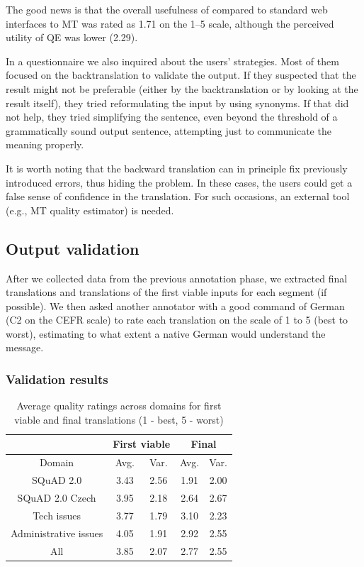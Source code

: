 The good news is that the overall usefulness of \ptakopet{} compared to standard web interfaces to MT was rated as 1.71 on the 1--5 scale, although the perceived utility of QE was lower (2.29).

In a questionnaire we also inquired about the users' strategies. Most of them focused on the backtranslation to validate the output. If they suspected that the result might not be preferable (either by the backtranslation or by looking at the result itself), they tried reformulating the input by using synonyms. If that did not help, they tried simplifying the sentence, even beyond the threshold of a grammatically sound output sentence, attempting just to communicate the meaning properly.

It is worth noting that the backward translation can in principle fix previously introduced errors, thus hiding the problem. In these cases, the users could get a false sense of confidence in the translation. For such occasions, an external tool (e.g., MT quality estimator) is needed.

\subsection{Output validation}
\label{validation}

After we collected data from the previous annotation phase, we extracted final translations and translations of the first viable inputs for each segment (if possible). We then asked another annotator with a good command of German (C2 on the CEFR scale) to rate each translation on the scale of 1 to 5 (best to worst), estimating to what extent a native German would understand the message. 

\subsubsection{Validation results}


\begin{table}[ht]
    \centering
    \begin{tabular}{| c | c c | c c |}
    \hline
         & \multicolumn{2}{c|}{First viable} & \multicolumn{2}{c|}{Final} \\
    \hline
    Domain & Avg. & Var. & Avg. & Var. \\
    \hline
        SQuAD 2.0 & 3.43 & 2.56 & 1.91 & 2.00 \\
        SQuAD 2.0 Czech & 3.95 & 2.18 & 2.64 & 2.67 \\
        Tech issues & 3.77 & 1.79 & 3.10 & 2.23 \\
        Administrative issues & 4.05 & 1.91 & 2.92 & 2.55 \\
        \hline
        All & 3.85 & 2.07 & 2.77 & 2.55 \\
    \hline
    \end{tabular}
    \caption{\label{tab:qe_annotation_basic} Average quality ratings across domains for first viable and final translations  (1 - best, 5 - worst) }
\end{table}

